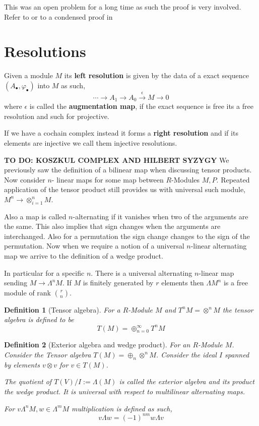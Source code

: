 \documentclass[12pt]{article}
\numberwithin{equation}{section}
\newtheorem{definition}{Definition}[section]
\begin{document}
	This was an open problem for a long time as such the proof is very involved. Refer to \cite{nlab:quillen-suslin_theorem} or to a condensed proof in \cite[p. ~848]{lang02}

		\section{Resolutions}
	Given a module $M$ its \textbf{left resolution} is given by the data of a exact sequence $(A_\bullet, \varphi_\bullet)$ into $M$ as such,
	\[ 	\cdots \to A_1	\to A_0 \xrightarrow{\epsilon} M \to 0 \]
	where $\epsilon $ is called the \textbf{augmentation map}, if the exact sequence is free its a free resolution and such for projective. 
	
	If we have a cochain complex instead it forms a \textbf{right resolution} and if its elements are injective we call them injective resolutions.
	
	\textbf{TO DO: KOSZKUL COMPLEX AND HILBERT SYZYGY}
	We previously saw the definition of a bilinear map when discussing tensor products. Now consider $n$- linear maps for some map between $R$-Modules $M,P$. Repeated application of the tensor product still provides us with universal such module, $M^n \to \otimes_{i=1}^n M$.
	
	Also a map is called $n$-alternating if it vanishes when two of the arguments are the same. This also implies that sign changes when the arguments are interchanged. Also for a permutation the sign change changes to the sign of the permutation. Now when we require a notion of a universal $n$-linear alternating map we arrive to the definition of a wedge product.
	
	In particular for a specific $n$. There is a universal alternating $n$-linear map sending $M \to \Lambda^n M$. If $M$ is finitely generated by $r$ elements then $\Lambda M^n$ is a free module of rank $\binom{r}{n}$.
	
	\begin{definition}[Tensor algebra]
		For a $R$-Module $M$ and $T^n M = \otimes^n M$ the tensor algebra is defined to be \[ T(M)=\oplus_{n=0}^\infty T^n M \]
	\end{definition}
	
	
	
	\begin{definition}[Exterior algebra and wedge product]
		For an $R$-Module $M$. Consider the Tensor algebra $T(M)=\oplus_n \otimes^n M	$. Consider the ideal $I$ spanned by elements $v \otimes v$ for $v \in T(M)$.
		
		The quotient of $T(V)/I := \Lambda(M) $ is called the exterior algebra and its product the wedge product.	It is universal with respect to multilinear alternating maps.
		
		For $v \Lambda^nM, w \in \Lambda^m M$ multiplication is defined as such,
		\[ v \Lambda w = (-1)^{nm} w \Lambda v\]
	\end{definition}
	
\end{document}
